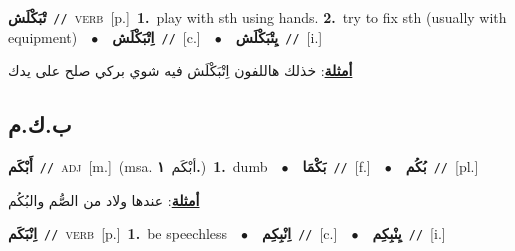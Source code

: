 \documentclass[10pt,a4paper,twoside]{article} %
\begin{document}
\begin{multicols}{2}
{\setlength\topsep{0pt}\textbf{\foreignlanguage{arabic}{تْبَكْلَش}}\ {\color{gray}\texttt{//}\color{black}}\ \textsc{verb}\ [p.]\ \textbf{1.}~play with sth using hands.  \textbf{2.}~try to fix sth (usually with equipment)\ \ $\bullet$\ \ \setlength\topsep{0pt}\textbf{\foreignlanguage{arabic}{اِتْبَكْلَش}}\ {\color{gray}\texttt{//}\color{black}}\ [c.]\ \ $\bullet$\ \ \setlength\topsep{0pt}\textbf{\foreignlanguage{arabic}{يِتْبَكْلَش}}\ {\color{gray}\texttt{//}\color{black}}\ [i.]\  \begin{flushright}\color{gray}\foreignlanguage{arabic}{\textbf{\underline{\foreignlanguage{arabic}{أمثلة}}}: خذلك هاللفون اِتْبَكْلَش فيه شوي بركي صلح على يدك}\end{flushright}\color{black}} \vspace{2mm}

\vspace{-3mm}
\subsection*{\color{blue}\foreignlanguage{arabic}{ب.ك.م}\color{blue}{}} 

{\setlength\topsep{0pt}\textbf{\foreignlanguage{arabic}{أَبْكَم}}\ {\color{gray}\texttt{//}\color{black}}\ \textsc{adj}\ [m.]\ \color{gray}(msa. \foreignlanguage{arabic}{أبْكَم}~\foreignlanguage{arabic}{\textbf{١.}})\color{black}\ \textbf{1.}~dumb\ \ $\bullet$\ \ \setlength\topsep{0pt}\textbf{\foreignlanguage{arabic}{بَكْمَا}}\ {\color{gray}\texttt{//}\color{black}}\ [f.]\ \ $\bullet$\ \ \setlength\topsep{0pt}\textbf{\foreignlanguage{arabic}{بُكُم}}\ {\color{gray}\texttt{//}\color{black}}\ [pl.]\  \begin{flushright}\color{gray}\foreignlanguage{arabic}{\textbf{\underline{\foreignlanguage{arabic}{أمثلة}}}: عندها ولاد من الصُّم والبُكُم}\end{flushright}\color{black}} \vspace{2mm}

{\setlength\topsep{0pt}\textbf{\foreignlanguage{arabic}{اِنْبَكَم}}\ {\color{gray}\texttt{//}\color{black}}\ \textsc{verb}\ [p.]\ \textbf{1.}~be speechless\ \ $\bullet$\ \ \setlength\topsep{0pt}\textbf{\foreignlanguage{arabic}{اِنْبِكِم}}\ {\color{gray}\texttt{//}\color{black}}\ [c.]\ \ $\bullet$\ \ \setlength\topsep{0pt}\textbf{\foreignlanguage{arabic}{يِنْبِكِم}}\ {\color{gray}\texttt{//}\color{black}}\ [i.]\ } \vspace{2mm}


\end{multicols}
\end{document}
